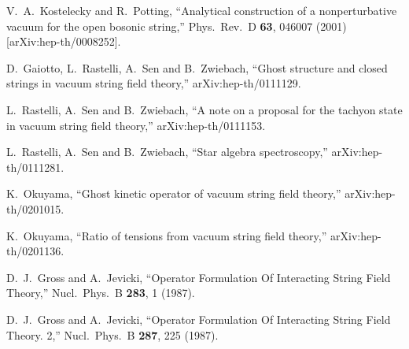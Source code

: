 \documentclass[a4paper,12pt]{article}
\begin{document}
\begin{thebibliography}{10}
V.~A.~Kostelecky and R.~Potting,
``Analytical construction of a nonperturbative vacuum for the open  bosonic string,''
Phys.\ Rev.\ D {\bf 63}, 046007 (2001)
[arXiv:hep-th/0008252].

D.~Gaiotto, L.~Rastelli, A.~Sen and B.~Zwiebach,
``Ghost structure and closed strings in vacuum string field theory,''
arXiv:hep-th/0111129.

L.~Rastelli, A.~Sen and B.~Zwiebach,
``A note on a proposal for the tachyon state in vacuum string field  theory,''
arXiv:hep-th/0111153.

L.~Rastelli, A.~Sen and B.~Zwiebach,
``Star algebra spectroscopy,''
arXiv:hep-th/0111281.

K.~Okuyama,
``Ghost kinetic operator of vacuum string field theory,''
arXiv:hep-th/0201015.

K.~Okuyama,
``Ratio of tensions from vacuum string field theory,''
arXiv:hep-th/0201136.

D.~J.~Gross and A.~Jevicki,
``Operator Formulation Of Interacting String Field Theory,''
Nucl.\ Phys.\ B {\bf 283}, 1 (1987).

D.~J.~Gross and A.~Jevicki,
``Operator Formulation Of Interacting String Field Theory. 2,''
Nucl.\ Phys.\ B {\bf 287}, 225 (1987).

\end{thebibliography}\endgroup
\end{document}
